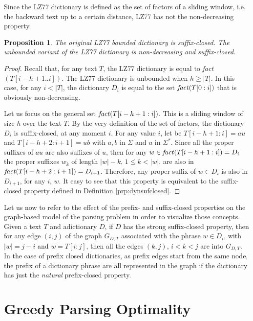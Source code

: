 \documentclass[12pt]{article}
\theoremstyle{plain}
\newtheorem{proposition}[theorem]{Proposition}
\theoremstyle{definition}
\theoremstyle{remark}
\begin{document}
Since the LZ77 dictionary is defined as the set of factors of a sliding window, i.e. the backward text up to a certain distance,  LZ77 has not the non-decreasing property.

\begin{proposition}\label{pro:lz77strong}
The original LZ77 bounded dictionary is suffix-closed. 
The unbounded variant of the LZ77 dictionary is non-decreasing and suffix-closed.
\end{proposition}

\begin{proof}
Recall that, for any text $T$, the LZ77 dictionary is equal to  \emph{fact}$(T[i-h+1..i])$.
The LZ77 dictionary is unbounded when $h\geq |T|$. In this case, for any $i<|T|$, the dictionary $D_i$ is equal to the set $\mbox{\emph{fact}}(T[0 : i])$ that is obviously non-decreasing.

Let us focus on the general set $\mbox{\emph{fact}}(T[i-h+1 : i])$. 
This is a sliding window of size $h$ over the text $T$.
By the very definition of the set of factors, the dictionary $D_i$ is suffix-closed, at any moment $i$.
For any value $i$, let be $T[i-h+1 : i]=au$ and $T[i-h+2 : i+1]=ub$ with $a,b$ in $\Sigma$ and $u$ in $\Sigma^*$. Since all the proper suffixes of $au$ are also suffixes of $u$, then for any $w\in \mbox{\emph{fact}}(T[i-h+1 : i])=D_i$ the proper suffixes $w_k$ of length $|w|-k$, $1\leq k < |w|$, are also in $\mbox{\emph{fact}}(T[i-h+2 : i+1])=D_{i+1}$. 
Therefore, any proper suffix of $w\in D_i$ is also in $D_{i+1}$, for any $i$, $w$.
It easy to see that this property is equivalent to the suffix-closed property defined in Definition \ref{prp:dynsufclosed}.
\end{proof} 




Let us now to refer to the effect of the prefix- and suffix-closed properties on the graph-based model of the parsing problem in order to visualize those concepts. 
Given a text $T$ and adictionary $D$, if $D$ has the strong suffix-closed property, then for any edge $(i,j)$ of the graph $G_{D,T}$ associated with the phrase $w\in D_i$, with $|w|=j-i$ and $w=T[i:j]$, then all the edges $(k,j)$, $i<k<j$ are into $G_{D,T}$. 
In the case of prefix closed dictionaries, as prefix edges start from the same node, the prefix of a dictionary phrase are all represented in the graph if the dictionary has just the \emph{natural} prefix-closed property.


\section{Greedy Parsing Optimality}\label{sec:optimality}
\end{document}
